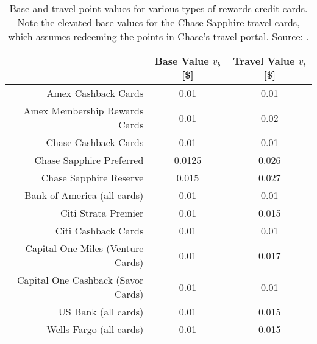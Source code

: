 \begin{table}[t!bh]
    \centering
    \begin{tabular}{ r c c} 
        \hline
         & Base Value $v_{b}$ [\$] & Travel Value $v_{t}$ [\$] \\ 
        \hline
        Amex Cashback Cards & 0.01 & 0.01 \\
        Amex Membership Rewards Cards & 0.01 & 0.02 \\
        Chase Cashback Cards & 0.01 & 0.01 \\
        Chase Sapphire Preferred & 0.0125 & 0.026 \\
        Chase Sapphire Reserve & 0.015 & 0.027 \\
        Bank of America (all cards) & 0.01 & 0.01 \\
        Citi Strata Premier & 0.01 & 0.015 \\
        Citi Cashback Cards & 0.01 & 0.01 \\
        Capital One Miles (Venture Cards) & 0.01 & 0.017 \\
        Capital One Cashback (Savor Cards) & 0.01 & 0.01 \\
        US Bank (all cards) & 0.01 & 0.015 \\
        Wells Fargo (all cards) & 0.01 & 0.015 \\
        \hline
    \end{tabular}
    \caption{Base and travel point values for various types of rewards credit cards. Note the elevated base values for the Chase Sapphire travel cards, which assumes redeeming the points in Chase's travel portal. Source: \citet{nerdwallet:2024}.}
    \label{tab:PointValues}
\end{table}


